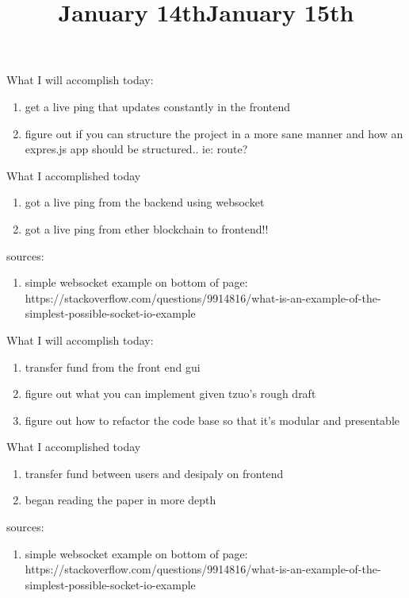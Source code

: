 \title{January 14th}

What I will accomplish today:

\begin{enumerate}
	\item get a live ping that updates constantly in the frontend
	\item figure out if you can structure the project in a more sane manner
		  and how an expres.js app should be structured.. 
		  ie: route? 
\end{enumerate}

What I accomplished today

\begin{enumerate}
	\item got a live ping from the backend using websocket
	\item got a live ping from ether blockchain to frontend!!
\end{enumerate}

sources:

\begin{enumerate}
	\item simple websocket example on bottom of page: https://stackoverflow.com/questions/9914816/what-is-an-example-of-the-simplest-possible-socket-io-example
\end{enumerate}



\title{January 15th}

What I will accomplish today:

\begin{enumerate}
	\item transfer fund from the front end gui
	\item figure out what you can implement given tzuo's rough draft
	\item figure out how to refactor the code base so that it's modular and presentable
\end{enumerate}

What I accomplished today

\begin{enumerate}
	\item transfer fund between users and desipaly on frontend
	\item began reading the paper in more depth
\end{enumerate}

sources:

\begin{enumerate}
	\item simple websocket example on bottom of page: https://stackoverflow.com/questions/9914816/what-is-an-example-of-the-simplest-possible-socket-io-example
\end{enumerate}


